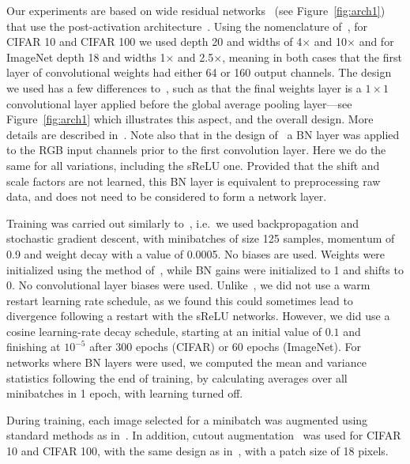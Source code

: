 \documentclass[conference]{IEEEtran}
\begin{document}
Our experiments are based on wide residual networks~\cite{Zagoruyko.16} (see Figure~\ref{fig:arch1}) that use  the post-activation architecture~\cite{He.16}. Using the nomenclature of~\cite{Zagoruyko.16}, for CIFAR 10 and CIFAR 100 we used depth 20 and widths of 4$\times$ and 10$\times$ and for ImageNet depth 18 and widths 1$\times$ and 2.5$\times$,  meaning in both cases that the first layer of convolutional weights had either 64  or 160 output channels. The design we used has a few differences to~\cite{Zagoruyko.16}, such as that the final weights layer is a $1\times 1$ convolutional layer applied before the global average pooling layer---see Figure~\ref{fig:arch1} which illustrates this aspect, and the overall design. More details are described in~\cite{McDonnell.18}. Note also that in the design of~\cite{McDonnell.18} a BN layer was applied to the RGB input channels prior to  the first convolution layer. Here we do the same for all variations, including the sReLU one. Provided that the shift and scale factors are not learned, this BN layer is equivalent to preprocessing raw data, and does not need to be considered to form a network layer. 






Training was carried out similarly to~\cite{McDonnell.18}, i.e.~we used backpropagation and stochastic gradient descent, with minibatches of size 125 samples, momentum of 0.9 and weight decay with a value of 0.0005. No biases are used. Weights were initialized using the method of~\cite{He.15}, while BN gains were initialized to 1 and shifts to 0. No convolutional layer biases were used. Unlike~\cite{McDonnell.18}, we did not use a warm restart learning rate schedule, as we found this could sometimes lead to divergence following a restart with the sReLU networks. However, we did use a cosine learning-rate decay schedule, starting at an initial value of $0.1$ and finishing at $10^{-5}$ after 300 epochs (CIFAR) or 60 epochs (ImageNet). For networks where BN layers were used, we computed the mean and variance statistics following the end of training, by calculating averages over all minibatches in 1 epoch, with learning turned off.


During training, each image selected for a minibatch was augmented using standard methods as in~\cite{McDonnell.18}.  In addition, cutout augmentation~\cite{Devries.17} was used for CIFAR 10 and CIFAR 100, with the same design as in~\cite{McDonnell.18},  with a patch size of 18 pixels.
\end{document}
